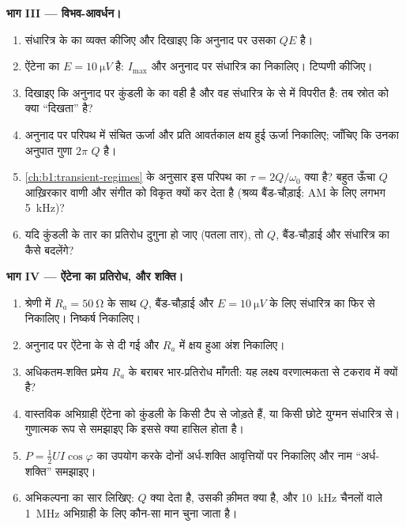 \begin{problem}
\medskip
\noindent\textbf{भाग III --- विभव-आवर्धन।}
\begin{enumerate}[resume]
  \item संधारित्र के  का  व्यक्त कीजिए और दिखाइए
        कि अनुनाद पर उसका  $QE$ है।
  \item ऐंटेना का  $E = \qty{10}{\micro V}$ है: $I_{\max}$
        और अनुनाद पर संधारित्र का  निकालिए। टिप्पणी कीजिए।
  \item दिखाइए कि अनुनाद पर कुंडली के  का  वही है और वह
        संधारित्र के  से  में विपरीत है: तब स्रोत को क्या
        ``दिखता'' है?
  \item अनुनाद पर परिपथ में संचित ऊर्जा और प्रति आवर्तकाल क्षय हुई
        ऊर्जा निकालिए; जाँचिए कि उनका अनुपात गुणा
        $2\pi$ $Q$ है।
  \item \cref{ch:b1:transient-regimes} के अनुसार इस परिपथ का 
        $\tau = 2Q/\omega_0$ क्या है? बहुत ऊँचा $Q$ आख़िरकार वाणी और संगीत
        को विकृत क्यों कर देता है (श्रव्य बैंड-चौड़ाई:
        AM के लिए लगभग \qty{5}{kHz})?
  \item यदि कुंडली के तार का प्रतिरोध दुगुना हो जाए (पतला तार), तो
        $Q$, बैंड-चौड़ाई और संधारित्र का  कैसे बदलेंगे?
\end{enumerate}

\medskip
\noindent\textbf{भाग IV --- ऐंटेना का प्रतिरोध, और शक्ति।}
\begin{enumerate}[resume]
  \item श्रेणी में $R_a = \qty{50}{\ohm}$ के साथ $Q$,
        बैंड-चौड़ाई और $E = \qty{10}{\micro V}$ के लिए संधारित्र का 
        फिर से निकालिए। निष्कर्ष निकालिए।
  \item अनुनाद पर ऐंटेना के  से दी गई  और
        $R_a$ में क्षय हुआ अंश निकालिए।
  \item अधिकतम-शक्ति प्रमेय $R_a$ के बराबर भार-प्रतिरोध माँगती:
        यह लक्ष्य वरणात्मकता से टकराव में क्यों है?
  \item वास्तविक अभिग्राही ऐंटेना को कुंडली के किसी टैप से जोड़ते हैं, या
        किसी छोटे युग्मन संधारित्र से। गुणात्मक रूप से समझाइए कि इससे क्या
        हासिल होता है।
  \item $P = \tfrac12 UI\cos\varphi$ का उपयोग करके दोनों अर्ध-शक्ति
        आवृत्तियों पर  निकालिए और नाम
        ``अर्ध-शक्ति'' समझाइए।
  \item अभिकल्पना का सार लिखिए: $Q$ क्या देता है, उसकी क़ीमत क्या है, और
        \qty{10}{kHz} चैनलों वाले \qty{1}{MHz} अभिग्राही के लिए कौन-सा मान
        चुना जाता है।
\end{enumerate}
\end{problem}
